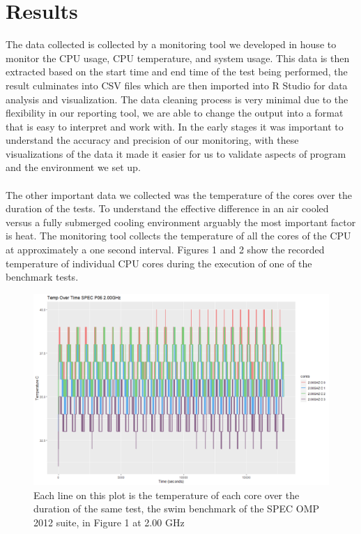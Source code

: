 \documentclass[sigconf]{acmart}
\begin{document}
\section{Results}
The data collected is collected by a monitoring tool we developed in house to monitor the CPU usage, CPU temperature, and system usage. This data is then extracted based on the start time and end time of the test being performed, the result culminates into CSV files which are then imported into R Studio for data analysis and visualization. The data cleaning process is very minimal due to the flexibility in our reporting tool, we are able to change the output into a format that is easy to interpret and work with. In the early stages it was important to understand the accuracy and precision of our monitoring, with these visualizations of the data it made it easier for us to validate aspects of program and the environment we set up.
\\\\
The other important data we collected was the temperature of the cores over the duration of the tests. To understand the effective difference in an air cooled versus a fully submerged cooling environment arguably the most important factor is heat. The monitoring tool collects the temperature of all the cores of the CPU at approximately a one second interval. Figures 1 and 2 show the recorded temperature of individual CPU cores during the execution of one of the benchmark tests.   
\begin{figure}[h]
    \centering
    \includegraphics[scale=.27]{p06swim2ghztemp.png}
    \caption{Each line on this plot is the temperature of each core over the duration of the same test, the swim benchmark of the SPEC OMP 2012 suite, in Figure 1 at 2.00 GHz}
\end{figure}
\end{document}

